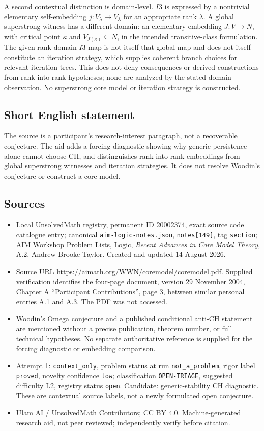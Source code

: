 \documentclass[11pt]{article}
\begin{document}
A second contextual distinction is domain-level. \(I3\) is expressed by a nontrivial elementary self-embedding \(j:V_\lambda\to V_\lambda\) for an appropriate rank \(\lambda\). A global superstrong witness has a different domain: an elementary embedding \(J:V\to N\), with critical point \(\kappa\) and \(V_{J(\kappa)}\subseteq N\), in the intended transitive-class formulation. The given rank-domain \(I3\) map is not itself that global map and does not itself constitute an iteration strategy, which supplies coherent branch choices for relevant iteration trees. This does not deny consequences or derived constructions from rank-into-rank hypotheses; none are analyzed by the stated domain observation. No superstrong core model or iteration strategy is constructed.
\subsection{Short English statement}
The source is a participant's research-interest paragraph, not a recoverable conjecture. The aid adds a forcing diagnostic showing why generic persistence alone cannot choose CH, and distinguishes rank-into-rank embeddings from global superstrong witnesses and iteration strategies. It does not resolve Woodin's conjecture or construct a core model.
\subsection{Sources}
\begin{itemize}
\item Local UnsolvedMath registry, permanent ID 20002374, exact source code catalogue entry; canonical \texttt{aim-logic-notes.json}, \texttt{notes[149]}, tag \texttt{section}; AIM Workshop Problem Lists, Logic, \emph{Recent Advances in Core Model Theory}, A.2, Andrew Brooke-Taylor. Created and updated 14 August 2026.
\item Source URL \url{https://aimath.org/WWN/coremodel/coremodel.pdf}. Supplied verification identifies the four-page document, version 29 November 2004, Chapter A ``Participant Contributions'', page 3, between similar personal entries A.1 and A.3. The PDF was not accessed.
\item Woodin's Omega conjecture and a published conditional anti-CH statement are mentioned without a precise publication, theorem number, or full technical hypotheses. No separate authoritative reference is supplied for the forcing diagnostic or embedding comparison.
\item Attempt 1: \texttt{context\_only}, problem status at run \texttt{not\_a\_problem}, rigor label \texttt{proved}, novelty confidence \texttt{low}; classification \texttt{OPEN-TRIAGE}, suggested difficulty L2, registry status \texttt{open}. Candidate: generic-stability CH diagnostic. These are contextual source labels, not a newly formulated open conjecture.
\item Ulam AI / UnsolvedMath Contributors; CC BY 4.0. Machine-generated research aid, not peer reviewed; independently verify before citation.
\end{itemize}
\end{document}
